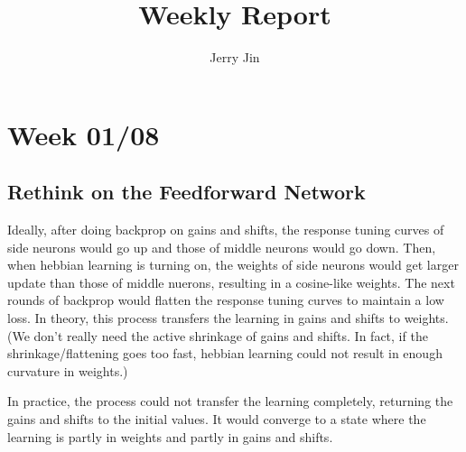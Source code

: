 \documentclass[12pt, a4paper]{article}
\title{Weekly Report}
\author{Jerry Jin}
\begin{document}
\maketitle

\section*{Week 01/08}

\subsection*{Rethink on the Feedforward Network}


Ideally, after doing backprop on gains and shifts, the response tuning curves of side neurons would go up and those of middle neurons would go down. Then, when hebbian learning is turning on, the weights of side neurons would get larger update than those of middle nuerons, resulting in a cosine-like weights. The next rounds of backprop would flatten the response tuning curves to maintain a low loss. In theory, this process transfers the learning in gains and shifts to weights. (We don't really need the active shrinkage of gains and shifts. In fact, if the shrinkage/flattening goes too fast, hebbian learning could not result in enough curvature in weights.)

In practice, the process could not transfer the learning completely, returning the gains and shifts to the initial values. It would converge to a state where the learning is partly in weights and partly in gains and shifts. 
\end{document}
